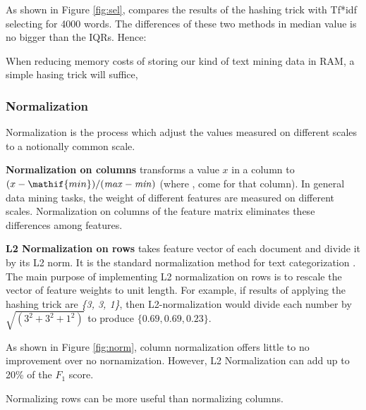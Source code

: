 \documentclass{sig-alternate-05-2015}
\theoremstyle{break}
\begin{document}
As shown in Figure \ref{fig:sel}, compares the results of the hashing trick with
Tf*idf selecting for 4000 words. The differences of these two methods in median value is no bigger than the IQRs.  Hence:
\begin{lesson}
When reducing memory costs of storing our kind of text mining data in RAM,
a simple hasing trick will suffice,
\end{lesson}



\subsubsection{Normalization}

Normalization is the process which adjust the values measured on different scales to a notionally common scale.

\textbf{Normalization on columns} transforms a  value $x$ in a column to $(x - \mathif{min})/(\mathit{max} - \mathit{min})$ (where ,  come
for that column).
 In general data mining tasks, the weight of different features are measured on different scales. Normalization on columns of the feature matrix eliminates these differences among features. 

\textbf{L2 Normalization on rows} takes feature vector of each document and divide it by its L2 norm. It is the standard normalization method for text categorization \cite{frank2006naive}. The main purpose of implementing L2 normalization on rows is to rescale the vector of feature weights to unit length. 
For example, if results of applying the hashing
trick are {\em \{3, 3, 1\}}, then L2-normalization would divide each number by
$\sqrt{(3^2+3^2+1^2)}$ to produce $\{0.69,   0.69, 0.23\}$.
 

 
 

As shown in Figure \ref{fig:norm}, column normalization offers little to no improvement
over no nornamization. However, L2 Normalization can add up to 20\% of the $F_1$ score.
\begin{lesson}
Normalizing rows can be more   useful than normalizing columns.
\end{lesson}
\end{document}
